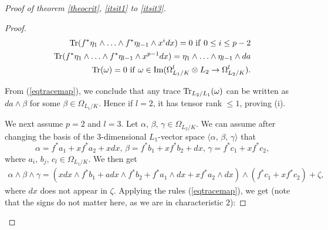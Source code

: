 \documentclass[10pt]{article}
\begin{document}
\begin{proof}[Proof of theorem \ref{theocrit}, \ref{itsit1} to \ref{itsit3}]
\begin{proof}
\begin{eqnarray}\label{eqtracemap}  {\rm Tr}(f^*\eta_1\wedge\ldots\wedge f^*\eta_{l-1}\wedge x^i dx)=0\,\,{\rm if}\,\,0\leq i\leq p-2\\
\nonumber
{\rm Tr}(f^*\eta_1\wedge\ldots\wedge f^*\eta_{l-1}\wedge x^{p-1} dx)=\eta_1\wedge\ldots\wedge\eta_{l-1}\wedge da\\
\nonumber
{\rm Tr}(\omega)=0\,\,{\rm if}\,\,\omega\in {\rm Im}(\Omega_{L_1/K}^l\otimes L_2\rightarrow \Omega_{L_2/K}^l).
\end{eqnarray}


From (\ref{eqtracemap}), we conclude that any trace
${\rm Tr}_{L_2/L_1}(\omega)$  can be written as $da\wedge\beta$ for some $\beta\in \Omega_{L_1/K}$. Hence if $l=2$, it has tensor rank $\leq 1$, proving (i).

We next assume $p=2$ and $l=3$. Let $\alpha,\,\beta,\,\gamma\in \Omega_{L_2/K}$. We can assume after changing the basis of the $3$-dimensional $L_1$-vector space $\langle \alpha,\,\beta,\,\gamma\rangle$  that
$$\alpha=f^*a_1+x f^*a_2+xdx,\,\beta=f^*b_1+xf^*b_2+ dx,\,\gamma=f^*c_1+xf^*c_2,$$
where $a_i,\,b_j,\,c_l\in \Omega_{L_1/K}$.
We then get
\begin{eqnarray}\label{eqwedgetrois} \alpha\wedge\beta\wedge \gamma=(xdx\wedge f^*b_1+a dx\wedge f^* b_2+f^*a_1\wedge dx+xf^*a_2\wedge dx)\wedge (f^*c_1+xf^*c_2)+ \zeta,
\end{eqnarray}
where $dx$ does not appear in $\zeta$. Applying the rules (\ref{eqtracemap}), we get (note that the signs do not matter here, as we are in characteristic $2$):


\end{proof}
\end{proof}
\end{document}

